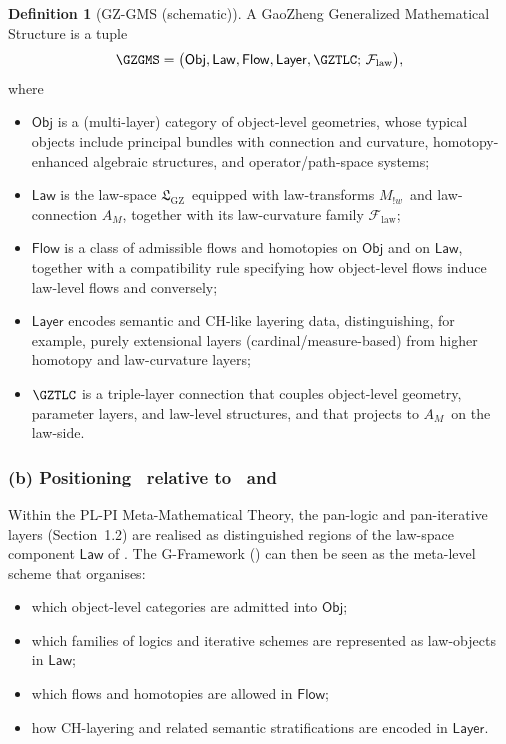 \documentclass[11pt]{book}
\theoremstyle{plain}
\theoremstyle{definition}
\newtheorem{definition}[theorem]{Definition} \theoremstyle{remark}
\newcommand{\PLPIMMT}{\text{PL-PI MMT}}
\newcommand{\GFramework}{\text{G-Framework}} \newcommand{\GAlgebra}{\text{G-Algebra}}
\newcommand{\GZLS}{\ensuremath{\mathfrak{L}_{\mathrm{GZ}}}}       \newcommand{\GZLT}{\ensuremath{M_{!w}}}                           \newcommand{\GZLOC}{\ensuremath{A_M}}                             \newcommand{\GZLCurv}{\ensuremath{\mathcal{F}_{\mathrm{law}}}}
\begin{document}
\begin{definition}[GZ-GMS (schematic)]
  A GaoZheng Generalized Mathematical Structure is a tuple
  \[
    \GZGMS =
    \bigl(\mathsf{Obj},\mathsf{Law},\mathsf{Flow},\mathsf{Layer},
          \GZTLC;\,\GZLCurv\bigr),
  \]
  where
  \begin{itemize}
    \item $\mathsf{Obj}$ is a (multi-layer) category of object-level
          geometries, whose typical objects include principal bundles
          with connection and curvature, homotopy-enhanced algebraic
          structures, and operator/path-space systems;
    \item $\mathsf{Law}$ is the law-space \GZLS\ equipped with
          law-transforms \GZLT\ and law-connection \GZLOC, together
          with its law-curvature family \GZLCurv;
    \item $\mathsf{Flow}$ is a class of admissible flows and homotopies
          on $\mathsf{Obj}$ and on $\mathsf{Law}$, together with a
          compatibility rule specifying how object-level flows induce
          law-level flows and conversely;
    \item $\mathsf{Layer}$ encodes semantic and CH-like layering data,
          distinguishing, for example, purely extensional layers
          (cardinal/measure-based) from higher homotopy and law-curvature
          layers;
    \item $\GZTLC$ is a triple-layer connection that couples
          object-level geometry, parameter layers, and law-level
          structures, and that projects to \GZLOC\ on the law-side.
  \end{itemize}
\end{definition}


\subsubsection*{(b) Positioning \GZGMS\ relative to \PLPIMMT\ and \GFramework}

Within the PL-PI Meta-Mathematical Theory, the pan-logic and
pan-iterative layers (Section~1.2) are realised as distinguished
regions of the law-space component $\mathsf{Law}$ of \GZGMS. The
G-Framework (\GFramework) can then be seen as the meta-level scheme
that organises:

\begin{itemize}
  \item which object-level categories are admitted into $\mathsf{Obj}$;
  \item which families of logics and iterative schemes are represented
        as law-objects in $\mathsf{Law}$;
  \item which flows and homotopies are allowed in $\mathsf{Flow}$;
  \item how CH-layering and related semantic stratifications are
        encoded in $\mathsf{Layer}$.
\end{itemize}
\end{document}
